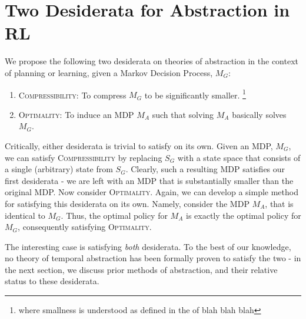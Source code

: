 \section{Two Desiderata for Abstraction in RL}

We propose the following two desiderata on theories of abstraction in the context of planning or learning, given a Markov Decision Process, $M_G$:
\begin{enumerate}
\item \textsc{Compressibility}: To compress $M_G$ to be significantly smaller. \footnote{where smallness is understood as defined in the of \cite{LITTMAN COMPLEXITY}  blah blah blah}
\item \textsc{Optimality}: To induce an MDP $M_A$ such that solving $M_A$ basically solves $M_G$.
\end{enumerate}


Critically, either desiderata is trivial to satisfy on its own. Given an \ac{MDP}, $M_G$, we can satisfy \textsc{Compressibility} by replacing $S_G$ with a state space that consists of a single (arbitrary) state from $S_G$. Clearly, such a resulting \ac{MDP} satisfies our first desiderata - we are left with an MDP that is substantially smaller than the original MDP. Now consider \textsc{Optimality}. Again, we can develop a simple method for satisfying this desiderata on its own. Namely, consider the MDP $M_A$, that is identical to $M_G$. Thus, the optimal policy for $M_A$ is exactly the optimal policy for $M_G$, consequently satisfying \textsc{Optimality}.

The interesting case is satisfying {\it both} desiderata. To the best of our knowledge, no theory of temporal abstraction has been formally proven to satisfy the two - in the next section, we discuss prior methods of abstraction, and their relative status to these desiderata.